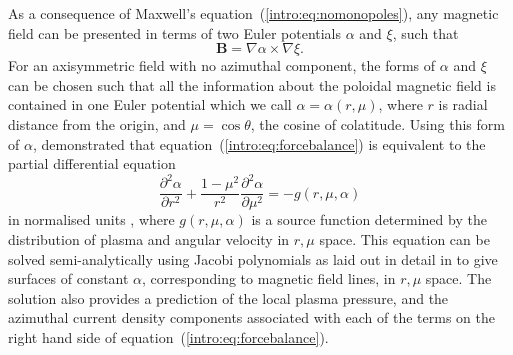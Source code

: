 As a consequence of Maxwell's equation~(\ref{intro:eq:nomonopoles}), any magnetic field can be presented in terms of two Euler potentials $\alpha$ and $\xi$, such that 
\begin{equation}
\boldsymbol{B} = \nabla \alpha \times \nabla \xi.
\end{equation}
For an axisymmetric field with no azimuthal component, the forms of $\alpha$ and $\xi$ can be chosen such that all the information about the poloidal magnetic field is contained in one Euler potential which we call $\alpha = \alpha(r,\mu)$, where $r$ is radial distance from the origin, and $\mu = \cos\theta$, the cosine of colatitude. Using this form of $\alpha$, \citet{caudal1986} demonstrated that equation~(\ref{intro:eq:forcebalance}) is equivalent to the partial differential equation
\begin{equation}\label{intro:eq:pde}
\frac{\partial^2\alpha}{\partial r^2} + \frac{1-\mu^2}{r^2} \frac{\partial^2\alpha}{\partial \mu^2} = -g(r,\mu,\alpha)
\end{equation}
in normalised units \citep[see][for details]{achilleos2010a}, where $g(r,\mu,\alpha)$ is a source function determined by the distribution of plasma and angular velocity in $r,\mu$ space. This equation can be solved semi-analytically using Jacobi polynomials as laid out in detail in \citet[Appendix]{achilleos2010a} to give surfaces of constant $\alpha$, corresponding to magnetic field lines, in $r, \mu$ space. The solution also provides a prediction of the local plasma pressure, and the azimuthal current density components associated with each of the terms on the right hand side of equation~(\ref{intro:eq:forcebalance}). 


